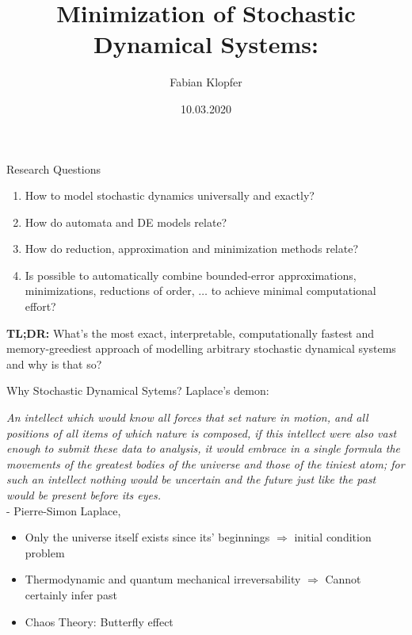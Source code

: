 \documentclass[rgb]{beamer}
\title{Minimization of Stochastic Dynamical Systems:}
\author{Fabian Klopfer}
\date{10.03.2020}
\institute{Modelling of Complex Self-Organizing Systems Group}
\begin{document}
    \begin{frame}
        \titlepage
    \end{frame}
    

    \begin{frame}{Research Questions}
        \begin{enumerate}
            \item How to model stochastic dynamics universally and exactly?
            \item How do automata and DE models relate? 
            \item How do reduction, approximation and minimization methods relate?
            \item Is possible to automatically combine bounded-error approximations, minimizations, reductions of order, $\dots$ to achieve minimal computational effort?
        \end{enumerate}
        \vfill
        \textbf{TL;DR:} What's the most exact, interpretable, computationally fastest and memory-greediest approach of modelling arbitrary stochastic dynamical systems and \alert{why} is that so?
    \end{frame}
    
    \begin{frame}{Why \alert{Stochastic} Dynamical Sytems?}
        Laplace's demon:
        \begin{center}
            \textit{An intellect which would know all forces that set nature in motion, and all positions of all items of which nature is composed, if this intellect were also vast enough to submit these data to analysis, it would embrace in a single formula the movements of the greatest bodies of the universe and those of the tiniest atom; for such an intellect nothing would be uncertain and the future just like the past would be present before its eyes.} \\
            - Pierre-Simon Laplace, \autocite{laplace1998pierre}
        \end{center}
        \vfill
        \begin{itemize}
            \item Only the universe itself exists since its' beginnings $\Rightarrow$ initial condition problem
            \item Thermodynamic and quantum mechanical irreversability $\Rightarrow$ Cannot certainly infer past
            \item Chaos Theory: Butterfly effect
        \end{itemize}
    \end{frame}
\end{document}
